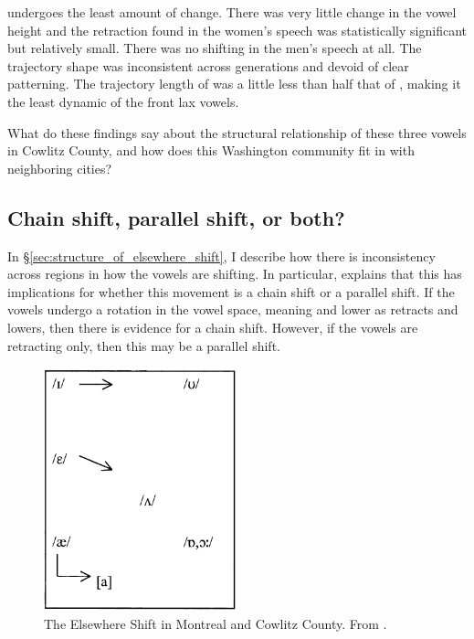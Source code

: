 \bit undergoes the least amount of change. There was very little change in the vowel height and the retraction found in the women's speech was statistically significant but relatively small. There was no shifting in the men's speech at all. The trajectory shape was inconsistent across generations and devoid of clear patterning. The trajectory length of \bit was a little less than half that of \bat, making it the least dynamic of the front lax vowels.

What do these findings say about the structural relationship of these three vowels in Cowlitz County, and how does this Washington community fit in with neighboring cities?

\subsection{Chain shift, parallel shift, or both?}
\label{sec:what_kind_of_shift}

In \S\ref{sec:structure_of_elsewhere_shift}, I describe how there is inconsistency across regions in how the vowels are shifting. In particular, \citet{boberg_2005} explains that this has implications for whether this movement is a chain shift or a parallel shift. If the vowels undergo a rotation in the vowel space, meaning \bet and \bit lower as \bat retracts and lowers, then there is evidence for a chain shift. However, if the vowels are retracting only, then this may be a parallel shift.

\begin{figure}[tb!]
    \centering
    \includegraphics[width = 0.5\textwidth]{Figures/other_figures/montreal_shift.pdf}
    \caption[The Elsewhere Shift in Montreal and Cowlitz County.]{The Elsewhere Shift in Montreal and Cowlitz County. From \citet[149]{boberg_2005}.}
    \label{fig:montreal_shift}
\end{figure}

